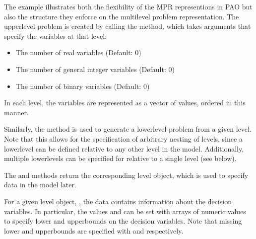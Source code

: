 \documentclass[letterpaper,10pt,english]{sphinxmanual}
\begin{document}
The example illustrates both the flexibility of the MPR representions
in PAO but also the structure they enforce on the multilevel problem
representation.  The upper\sphinxhyphen{}level problem is created by calling the
 method, which takes arguments that specify the
variables at that level:
\begin{itemize}
\item {} 
 \sphinxhyphen{} The number of real variables (Default: 0)

\item {} 
 \sphinxhyphen{} The number of general integer variables (Default: 0)

\item {} 
 \sphinxhyphen{} The number of binary variables (Default: 0)

\end{itemize}

In each level, the variables are represented as a vector of values,
ordered in this manner.

Similarly, the  method is used to generate a lower\sphinxhyphen{}level
problem from a given level.  Note that this allows for the specification
of arbitrary nesting of levels, since a lower\sphinxhyphen{}level can be defined
relative to any other level in the model.  Additionally, multiple
lower\sphinxhyphen{}levels can be specified for relative to a single level (see below).

The  and  methods return the
corresponding level object, which is used to specify data in the model
later.

For a given level object, , the data  contains
information about the decision variables.  In particular, the values
 and  can be set with arrays
of numeric values to specify lower\sphinxhyphen{} and upper\sphinxhyphen{}bounds on the decision
variables.  Note that missing lower\sphinxhyphen{} and upper\sphinxhyphen{}bounds are specified with
 and  respectively.
\end{document}
